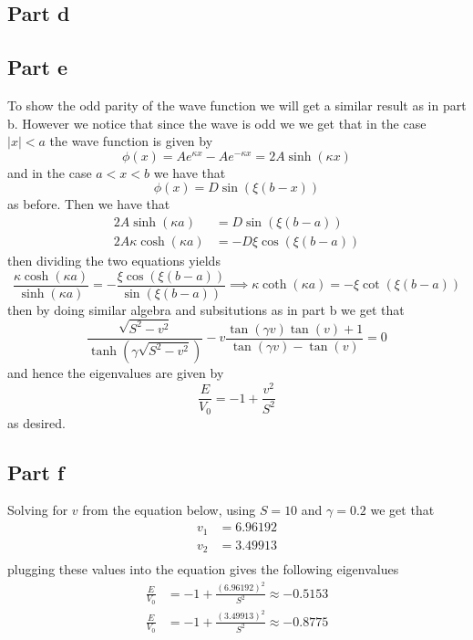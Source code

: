 \documentclass[12pt]{report}
\begin{document}
\subsection*{Part d}
\subsection*{Part e}
To show the odd parity of the wave function we will get a similar result as in part b. However we notice that since the wave is odd we we get that in the case $|x| < a$ the wave function is given by
\begin{equation*}
  \phi(x) = Ae^{\kappa x} - Ae^{-\kappa x} = 2A\sinh(\kappa x)
\end{equation*}
and in the case $a < x < b$ we have that
\begin{equation*}
    \phi(x) = D \sin(\xi (b-x))
\end{equation*}
as before. Then we have that
\begin{align*}
  2A\sinh(\kappa a) &= D \sin(\xi(b-a)) \\
  2A\kappa \cosh(\kappa a) &= -D\xi\cos(\xi(b-a))
\end{align*}
then dividing the two equations yields
\begin{equation*}
    \frac{\kappa \cosh(\kappa a)}{\sinh(\kappa a)} = -\frac{\xi \cos(\xi(b-a))}{\sin(\xi(b-a))} \implies \kappa \coth(\kappa a) = -\xi \cot(\xi(b-a))
\end{equation*}
then by doing similar algebra and subsitutions as in part b we get that
\begin{equation*}
  \frac{\sqrt{S^2 - v^2}}{\tanh(\gamma \sqrt{S^2 - v^2})} - v \frac{\tan(\gamma v)\tan(v) + 1}{\tan(\gamma v) - \tan(v)} = 0
\end{equation*}
and hence the eigenvalues are given by 
\begin{equation*}
  \frac{E}{V_0} = -1 + \frac{v^2}{S^2}
\end{equation*}
as desired.

\subsection*{Part f}
Solving for $v$ from the equation below, using $S = 10$ and $\gamma = 0.2$ we get that
\begin{align*}
  v_1 &=   6.96192 \\
  v_2 &= 3.49913 \\
\end{align*}
plugging these values into the equation gives the following eigenvalues
\begin{align*}
  \frac{E}{V_0} &= -1 + \frac{(6.96192)^2}{S^2} \approx -0.5153\\
  \frac{E}{V_0} &= -1 + \frac{(3.49913)^2}{S^2} \approx -0.8775
\end{align*}
\end{document}
